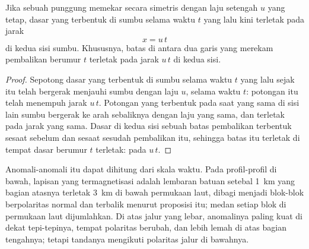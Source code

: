 \begin{proposition}\label{prop:g11:drift-to-spreading:stripe}
Jika sebuah punggung memekar secara simetris dengan laju setengah $u$ yang
tetap, dasar yang terbentuk di sumbu selama waktu $t$ yang lalu kini terletak
pada jarak
\[
  x = u\,t
\]
di kedua sisi sumbu. Khususnya, batas di antara dua garis yang merekam
pembalikan berumur $t$ terletak pada jarak $u\,t$ di kedua sisi.
\end{proposition}

\begin{proof}
Sepotong dasar yang terbentuk di sumbu selama waktu $t$ yang lalu sejak itu
telah bergerak menjauhi sumbu dengan laju $u$, selama waktu $t$: potongan itu
telah menempuh jarak $u\,t$. Potongan yang terbentuk pada saat yang sama di
sisi lain sumbu bergerak ke arah sebaliknya dengan laju yang sama, dan terletak
pada jarak yang sama. Dasar di kedua sisi sebuah batas pembalikan terbentuk
sesaat sebelum dan sesaat sesudah pembalikan itu, sehingga batas itu terletak
di tempat dasar berumur $t$ terletak: pada $u\,t$.
\end{proof}

Anomali-anomali itu dapat dihitung dari skala waktu. Pada profil-profil di
bawah, lapisan yang termagnetisasi adalah lembaran batuan setebal \qty{1}{km}
yang bagian atasnya terletak \qty{3}{km} di bawah permukaan laut, dibagi
menjadi blok-blok berpolaritas normal dan terbalik menurut proposisi itu; medan
setiap blok di permukaan laut dijumlahkan. Di atas jalur yang lebar, anomalinya
paling kuat di dekat tepi-tepinya, tempat polaritas berubah, dan lebih lemah di
atas bagian tengahnya; tetapi tandanya mengikuti polaritas jalur di bawahnya.

